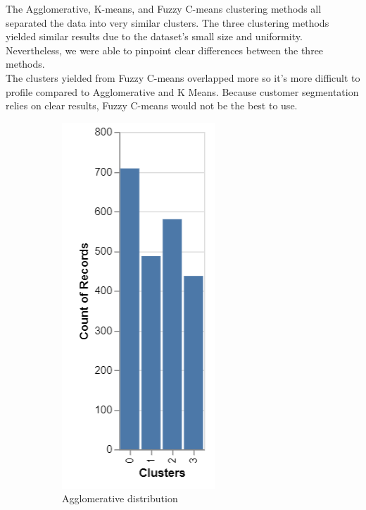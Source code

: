 \documentclass[12pt]{article}
\begin{document}
\noindent The Agglomerative, K-means, and Fuzzy C-means clustering methods all separated the data into very similar clusters. The three clustering methods yielded similar results due to the dataset's small size and uniformity. Nevertheless, we were able to pinpoint clear differences between the three methods.\\

\noindent The clusters yielded from Fuzzy C-means overlapped more so it’s more difficult to profile compared to Agglomerative and K Means. Because customer segmentation relies on clear results, Fuzzy C-means would not be the best to use.\\

\begin{figure}[H]
  \begin{subfigure}{0.48\textwidth}
    \centering
    \includegraphics[scale = 0.5]{figures/Agglomerative_distribution.PNG}
    \caption{Agglomerative distribution}
  \end{subfigure}
  \begin{subfigure}{0.48\textwidth}
    \centering

\end{subfigure}
\end{figure}
\end{document}

